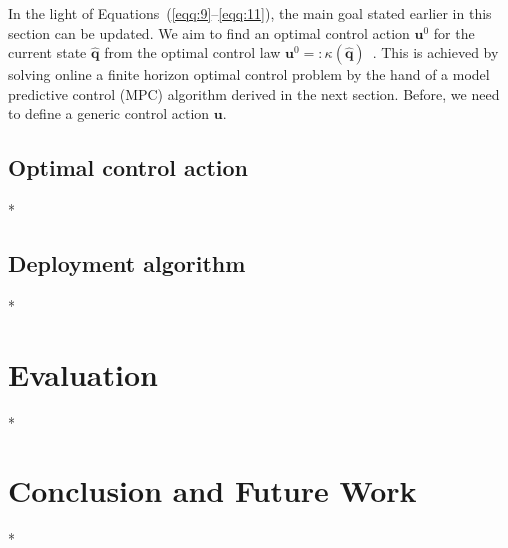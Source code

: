 \documentclass[letterpaper,10pt,conference]{ieeeconf}
\begin{document}
In the light of Equations~(\ref{eqq:9}--\ref{eqq:11}), the main goal stated earlier in this section can be updated. We aim to find an optimal control action $\mathbf{u}^0$ for the current state $\hat{\mathbf{q}}$ from the optimal control law $\mathbf{u}^0=:\kappa(\hat{\mathbf{q}})$~\cite{rawlings2017model}. This is achieved by solving online a finite horizon optimal control problem by the hand of a model predictive control (MPC) algorithm derived in the next section. Before, we need to define a generic control action $\mathbf{u}$.

\subsection{Optimal control action}

*

\subsection{Deployment algorithm}

*

\section{Evaluation}
\label{sec:experimental}

*

\section{Conclusion and Future Work}
\label{sec:conclusion}

*


 
\vspace{0.1ex}

\newpage
\end{document}
